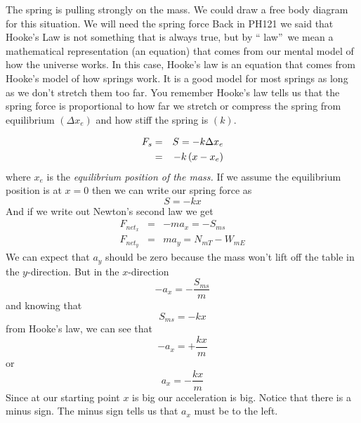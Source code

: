 \documentclass{book}
\begin{document}
The spring is pulling strongly on
the mass. We could draw a free body diagram for this situation. We will need
the spring force Back in PH121 we said that
Hooke's Law is not something that is always true, but by \textquotedblleft
law\textquotedblright\ we mean a mathematical representation (an equation)
that comes from our mental model of how the universe works. In this case,
Hooke's law is an equation that comes from Hooke's model of how springs
work. It is a good model for most springs as long as we don't stretch them
too far. You remember Hooke's law tells us that the spring force is
proportional to how far we stretch or compress the spring from equilibrium $%
\left( \Delta x_{e}\right) $ and how stiff the spring is $\left( k\right) .$

\begin{eqnarray}
F_{s} &=&S=-k\Delta x_{e} \\
&=&-k\left( x-x_{e}\right)  \notag
\end{eqnarray}%
where $x_{e}$ is the \emph{equilibrium position of the mass. }If we assume
the equilibrium position is at $x=0$ then we can write our spring force as%
\begin{equation}
S=-kx
\end{equation}%
And if we write out Newton's second law we get 
\begin{eqnarray*}
F_{net_{x}} &=&-ma_{x}=-S_{ms} \\
F_{net_{y}} &=&ma_{y}=N_{mT}-W_{mE}
\end{eqnarray*}%
We can expect that $a_{y}$ should be zero because the mass won't lift off
the table in the $y$-direction. But in the $x$-direction 
\begin{equation*}
-a_{x}=-\frac{S_{ms}}{m}
\end{equation*}%
and knowing that 
\begin{equation*}
S_{ms}=-kx
\end{equation*}%
from Hooke's law, we can see that 
\begin{equation*}
-a_{x}=+\frac{kx}{m}
\end{equation*}%
or 
\begin{equation*}
a_{x}=-\frac{kx}{m}
\end{equation*}%
Since at our starting point $x$ is big our acceleration is big. Notice that
there is a minus sign. The minus sign tells us that $a_{x}$ must be to the
left.
\end{document}

